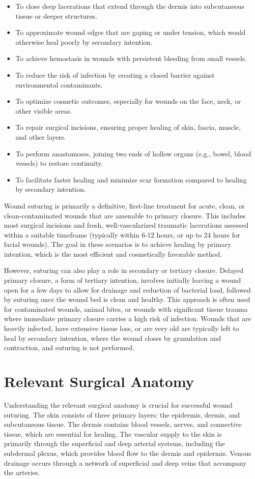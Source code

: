 \begin{itemize}
  \item To close deep lacerations that extend through the dermis into subcutaneous tissue or deeper structures.
  \item To approximate wound edges that are gaping or under tension, which would otherwise heal poorly by secondary intention.
  \item To achieve hemostasis in wounds with persistent bleeding from small vessels.
  \item To reduce the risk of infection by creating a closed barrier against environmental contaminants.
  \item To optimize cosmetic outcomes, especially for wounds on the face, neck, or other visible areas.
  \item To repair surgical incisions, ensuring proper healing of skin, fascia, muscle, and other layers.
  \item To perform anastomoses, joining two ends of hollow organs (e.g., bowel, blood vessels) to restore continuity.
  \item To facilitate faster healing and minimize scar formation compared to healing by secondary intention.
\end{itemize}

Wound suturing is primarily a definitive, first-line treatment for acute, clean, or clean-contaminated wounds that are amenable to primary closure. This includes most surgical incisions and fresh, well-vascularized traumatic lacerations assessed within a suitable timeframe (typically within 6-12 hours, or up to 24 hours for facial wounds). The goal in these scenarios is to achieve healing by primary intention, which is the most efficient and cosmetically favorable method.

However, suturing can also play a role in secondary or tertiary closure. Delayed primary closure, a form of tertiary intention, involves initially leaving a wound open for a few days to allow for drainage and reduction of bacterial load, followed by suturing once the wound bed is clean and healthy. This approach is often used for contaminated wounds, animal bites, or wounds with significant tissue trauma where immediate primary closure carries a high risk of infection. Wounds that are heavily infected, have extensive tissue loss, or are very old are typically left to heal by secondary intention, where the wound closes by granulation and contraction, and suturing is not performed.

\section*{Relevant Surgical Anatomy}
Understanding the relevant surgical anatomy is crucial for successful wound suturing. The skin consists of three primary layers: the epidermis, dermis, and subcutaneous tissue. The dermis contains blood vessels, nerves, and connective tissue, which are essential for healing. The vascular supply to the skin is primarily through the superficial and deep arterial systems, including the subdermal plexus, which provides blood flow to the dermis and epidermis. Venous drainage occurs through a network of superficial and deep veins that accompany the arteries.

